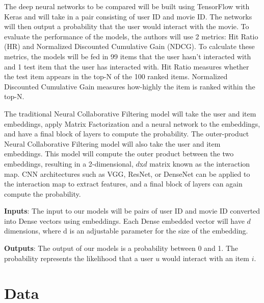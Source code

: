 \documentclass{article}
\begin{document}
The deep neural networks to be compared will be built using TensorFlow with Keras and will take in a pair consisting of user ID and movie ID. The networks will then output a probability that the user would interact with the movie. To evaluate the performance of the models, the authors will use 2 metrics: Hit Ratio (HR) and Normalized Discounted Cumulative Gain (NDCG). To calculate these metrics, the models will be fed in 99 items that the user hasn't interacted with and 1 test item that the user has interacted with. Hit Ratio measures whether the test item appears in the top-N of the 100 ranked items. Normalized Discounted Cumulative Gain measures how-highly the item is ranked within the top-N.

The traditional Neural Collaborative Filtering model will take the user and item embeddings, apply Matrix Factorization and a neural network to the embeddings, and have a final block of layers to compute the probability. The outer-product Neural Collaborative Filtering model will also take the user and item embeddings. This model will compute the outer product between the two embeddings, resulting in a 2-dimensional, $d$x$d$ matrix known as the interaction map. CNN architectures such as VGG, ResNet, or DenseNet can be applied to the interaction map to extract features, and a final block of layers can again compute the probability.

\textbf{Inputs}: The input to our models will be pairs of user ID and movie ID converted into Dense vectors using embeddings. Each Dense embedded vector will have $d$ dimensions, where d is an adjustable parameter for the size of the embedding.

\textbf{Outputs}: The output of our models is a probability between 0 and 1. The probability represents the likelihood that a user $u$ would interact with an item $i$.

\section{Data}
\label{sec:Data}
\end{document}
